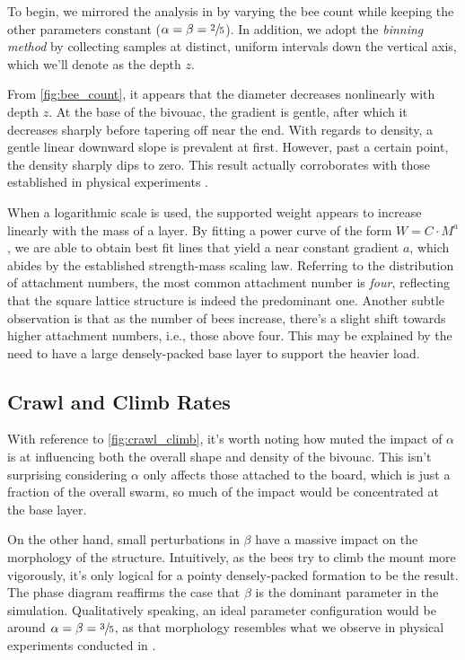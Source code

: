 \documentclass[a4paper,11pt]{article}
\begin{document}
To begin, we mirrored the analysis in \cite{shishkov2022strength} by varying the bee count while
keeping the other parameters constant ($\alpha = \beta = \sfrac{2}{5}$). In addition, we
adopt the \textit{binning method} by collecting samples at distinct, uniform intervals down
the vertical axis, which we'll denote as the depth $z$.

From \autoref{fig:bee_count}, it appears that the diameter decreases nonlinearly with depth $z$. At the
base of the bivouac, the gradient is gentle, after which it decreases sharply before tapering off near
the end. With regards to density, a gentle linear downward slope is prevalent at first.
However, past a certain point, the density sharply dips to zero. This result actually corroborates with
those established in physical experiments \cite{shishkov2022strength}.

When a logarithmic scale is used, the supported weight appears to increase linearly with the mass of a layer. By fitting
a power curve of the form $W = C \cdot M^{a}$, we are able to obtain best fit lines that yield a near
constant gradient $a$, which abides by the established strength-mass scaling law. Referring to
the distribution of attachment numbers, the most common attachment number is \textit{four}, reflecting that
the square lattice structure is indeed the predominant one. Another subtle observation is that as the number of
bees increase, there's a slight shift towards higher attachment numbers, i.e., those above four. This may be explained by
the need to have a large densely-packed base layer to support the heavier load.

\subsection{Crawl and Climb Rates}

With reference to \autoref{fig:crawl_climb}, it's worth noting how muted the impact of
$\alpha$ is at influencing both the overall shape and density of the bivouac. This isn't surprising
considering $\alpha$ only affects those attached to the board, which is just a fraction of the overall swarm,
so much of the impact would be concentrated at the base layer.

On the other hand, small perturbations in $\beta$ have a massive impact on the morphology
of the structure. Intuitively, as the bees try to climb the mount more vigorously, it's only
logical for a pointy densely-packed formation to be the result. The phase diagram reaffirms the
case that $\beta$ is the dominant parameter in the simulation. Qualitatively speaking, an
ideal parameter configuration would be around $\alpha = \beta = \sfrac{3}{5}$, as that morphology
resembles what we observe in physical experiments conducted in \cite{peleg2018collective}.
\end{document}
